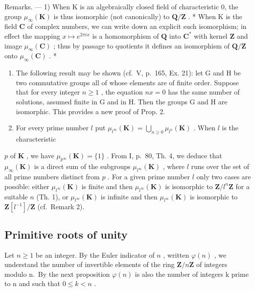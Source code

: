 Remarks. --- 1) When K is an algebraically closed field of characteristic 0, the group \(\mu_{\infty}(\mathbf{K})\) is thus isomorphic (not canonically) to \(\mathbf{Q}/\mathbf{Z}\) . * When K is the field \(\mathbf{C}\) of complex numbers, we can write down an explicit such isomorphism; in effect the mapping \(x \mapsto e^{2\pi ix}\) is a homomorphism of \(\mathbf{Q}\) into \(\mathbf{C}^*\) with kernel \(\mathbf{Z}\) and image \(\mu_{\infty}(\mathbf{C})\) ; thus by passage to quotients it defines an isomorphism of \(\mathbf{Q}/\mathbf{Z}\) onto \(\mu_{\infty}(\mathbf{C})\) . *

\begin{enumerate}
\def\labelenumi{\arabic{enumi})}
\setcounter{enumi}{1}
\item
  The following result may be shown (cf.~V, p.~165, Ex. 21): let G and H be two commutative groups all of whose elements are of finite order. Suppose that for every integer \(n \geqslant 1\) , the equation \(nx = 0\) has the same number of solutions, assumed finite in G and in H. Then the groups G and H are isomorphic. This provides a new proof of Prop. 2.
\item
  For every prime number \(l\) put \(\mu_{l^{\infty}}(\mathbf{K}) = \bigcup_{n\geqslant 0}\mu_{l^{n}}(\mathbf{K})\) . When \(l\) is the characteristic
\end{enumerate}

\(p\) of \(\mathbf{K}\) , we have \(\mu_{p^{\infty}}(\mathbf{K}) = \{1\}\) . From I, p.~80, Th. 4, we deduce that \(\mu_{\infty}(\mathbf{K})\) is a direct sum of the subgroups \(\mu_{l^{\infty}}(\mathbf{K})\) , where \(l\) runs over the set of all prime numbers distinct from \(p\) . For a given prime number \(l\) only two cases are possible: either \(\mu_{l^{\infty}}(\mathbf{K})\) is finite and then \(\mu_{l^{\infty}}(\mathbf{K})\) is isomorphic to \(\mathbf{Z}/l^{n}\mathbf{Z}\) for a suitable \(n\) (Th. 1), or \(\mu_{l^{\infty}}(\mathbf{K})\) is infinite and then \(\mu_{l^{\infty}}(\mathbf{K})\) is isomorphic to \(\mathbf{Z}[l^{-1}]/\mathbf{Z}\) (cf.~Remark 2).

\subsection{Primitive roots of unity}

Let \(n \geqslant 1\) be an integer. By the Euler indicator of \(n\) , written \(\varphi(n)\) , we understand the number of invertible elements of the ring \(\mathbf{Z}/n\mathbf{Z}\) of integers modulo n.~By the next proposition \(\varphi(n)\) is also the number of integers k prime to n and such that \(0 \leqslant k < n\) .

